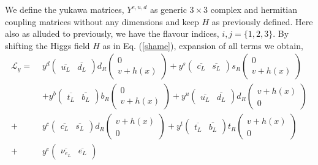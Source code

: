We define the yukawa matrices, $Y^{e,u,d}$ as generic $3\times3$ complex and hermitian coupling matrices without any dimensions and keep $H$ as previously defined. Here also as alluded to previously, we have the flavour indices, $i,j=\{ 1,2,3 \}$. By shifting the Higgs field $H$ as in Eq. (\ref{shame}), { \color{gray} expansion of all  terms we obtain, 
%
\begin{align}
\mathcal{L}_y = \, \, & y^d 
\begin{pmatrix}
\overline{u_L} & \overline{d_L} 
\end{pmatrix} d_R 
\begin{pmatrix}
0\\ v + h(x)
\end{pmatrix}  + 
y^s 
\begin{pmatrix}
\overline{c_L} & \overline{s_L} 
\end{pmatrix} s_R 
\begin{pmatrix}
0 \\ v + h(x)
\end{pmatrix} \nonumber  \\ & +
 y^b 
\begin{pmatrix}
\overline{t_L} & \overline{b_L} 
\end{pmatrix} b_R 
\begin{pmatrix}
0 \\ v + h(x)
\end{pmatrix}  +
 y^u 
\begin{pmatrix}
\overline{u_L} & \overline{d_L} 
\end{pmatrix} d_R 
\begin{pmatrix}
v + h(x) \\ 0
\end{pmatrix} \nonumber \\ + &   y^c 
\begin{pmatrix}
\overline{c_L} & \overline{s_L} 
\end{pmatrix} d_R 
\begin{pmatrix}
v + h(x) \\ 0 
\end{pmatrix} +
y^t
\begin{pmatrix}
\overline{t_L} & \overline{b_L} 
\end{pmatrix} t_R \begin{pmatrix}
 v + h(x) \\ 0
\end{pmatrix}   \\ + &  y^e 
\begin{pmatrix}
\overline{\nu_{e_L}} & \overline{e_L} 

\end{pmatrix}
\end{align}}
